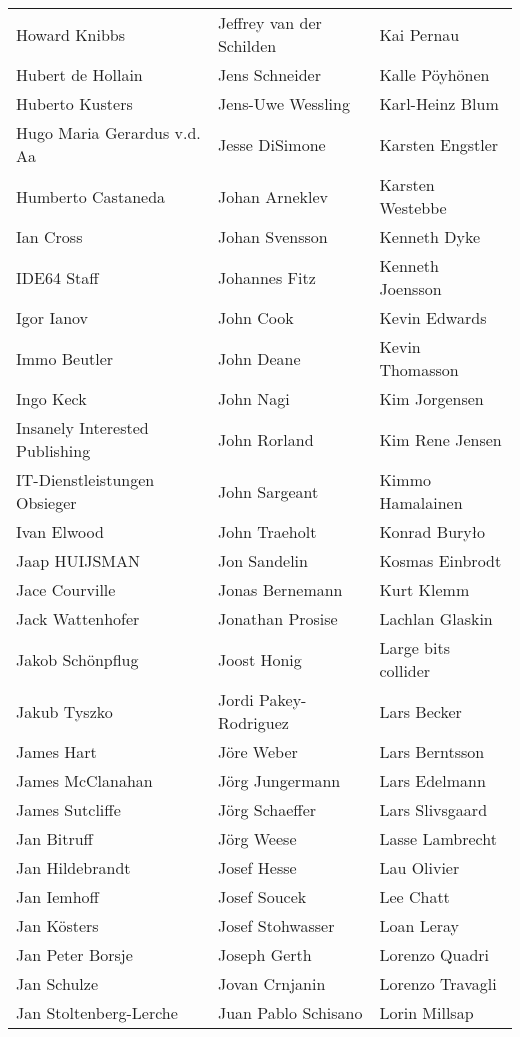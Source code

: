 \begin{tabular}{p{4.5cm}p{4.5cm}p{4.5cm}}
Howard Knibbs & Jeffrey van der Schilden & Kai Pernau \\
Hubert de Hollain & Jens Schneider & Kalle Pöyhönen \\
Huberto Kusters & Jens-Uwe Wessling & Karl-Heinz Blum \\
Hugo Maria Gerardus v.d. Aa & Jesse DiSimone & Karsten Engstler \\
Humberto Castaneda & Johan Arneklev & Karsten Westebbe \\
Ian Cross & Johan Svensson & Kenneth Dyke \\
IDE64 Staff & Johannes Fitz & Kenneth Joensson \\
Igor Ianov & John Cook & Kevin Edwards \\
Immo Beutler & John Deane & Kevin Thomasson \\
Ingo Keck & John Nagi & Kim Jorgensen \\
Insanely Interested Publishing & John Rorland & Kim Rene Jensen \\
IT-Dienstleistungen Obsieger & John Sargeant & Kimmo Hamalainen \\
Ivan Elwood & John Traeholt & Konrad Buryło \\
Jaap HUIJSMAN & Jon Sandelin & Kosmas Einbrodt \\
Jace Courville & Jonas Bernemann & Kurt Klemm \\
Jack Wattenhofer & Jonathan Prosise & Lachlan Glaskin \\
Jakob Schönpflug & Joost Honig & Large bits collider \\
Jakub Tyszko & Jordi Pakey-Rodriguez & Lars Becker \\
James Hart & Jöre Weber & Lars Berntsson \\
James McClanahan & Jörg Jungermann & Lars Edelmann \\
James Sutcliffe & Jörg Schaeffer & Lars Slivsgaard \\
Jan Bitruff & Jörg Weese & Lasse Lambrecht \\
Jan Hildebrandt & Josef Hesse & Lau Olivier \\
Jan Iemhoff & Josef Soucek & Lee Chatt \\
Jan Kösters & Josef Stohwasser & Loan Leray \\
Jan Peter Borsje & Joseph Gerth & Lorenzo Quadri \\
Jan Schulze & Jovan Crnjanin & Lorenzo Travagli \\
Jan Stoltenberg-Lerche & Juan Pablo Schisano & Lorin Millsap \\

\end{tabular}
